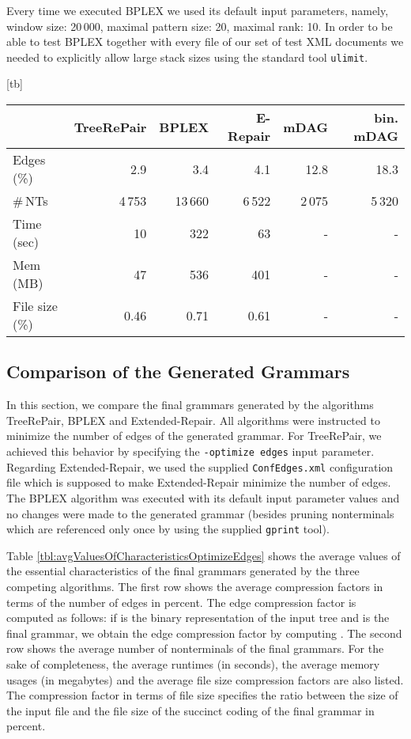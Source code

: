 \documentclass[12pt]{llncs}
\makeatletter
\renewenvironment{table}
               {\setlength\abovecaptionskip{10\p@}\setlength\belowcaptionskip{10\p@}\@float{table}}
               {\end@float}
\newcommand{\trp}{\mbox{TreeRePair}\xspace}
\makeatother
\begin{document}
Every time we executed BPLEX we used its default input parameters, namely, window size: 20\,000, maximal pattern size: 20, maximal rank: 10. In order to be able to test BPLEX together with every file of our set of test XML documents we needed to explicitly allow large stack sizes using the standard tool \texttt{ulimit}.

\begin{table}[tb]
	\centering\small
	\begin{tabular}{lrrrrr}
		\toprule
		&\trp&BPLEX&E-Repair&mDAG&bin. mDAG\\
		\midrule
		Edges (\%)&2.9&3.4&4.1&12.8&18.3\\
		\#\,NTs&4\,753&13\,660&6\,522&2\,075&5\,320\\
		\midrule
		Time (sec)&10&322&63&-&-\\
		Mem (MB)&47&536&401&-&-\\
		File size (\%)&0.46&0.71&0.61&-&-\\
		\bottomrule
	\end{tabular}
	\caption{Average values of the characteristics of the generated grammars and of the corresponding runs of the algorithms.}
	\label{tbl:avgValuesOfCharacteristicsOptimizeEdges}
\end{table}

\subsection{Comparison of the Generated Grammars}

In this section, we compare the final grammars generated by the algorithms \trp, BPLEX and Extended-Repair. All algorithms were instructed to minimize the number of edges of the generated grammar. For \trp, we achieved this behavior by specifying the \texttt{-optimize edges} input parameter. Regarding Extended-Repair, we used the supplied \texttt{ConfEdges.xml} configuration file which is supposed to make Extended-Repair minimize the number of edges. The BPLEX algorithm was executed with its default input parameter values and no changes were made to the generated grammar (besides pruning nonterminals which are referenced only once by using the supplied \texttt{gprint} tool).

Table \ref{tbl:avgValuesOfCharacteristicsOptimizeEdges} shows the average values of the essential characteristics of the final grammars generated by the three competing algorithms. The first row shows the average compression factors in terms of the number of edges in percent. The edge compression factor is computed as follows: if  is the binary representation of the input tree and  is the final grammar, we obtain the edge compression factor by computing . The second row shows the average number of nonterminals of the final grammars. For the sake of completeness, the average runtimes (in seconds), the average memory usages (in megabytes) and the average file size compression factors are also listed. The compression factor in terms of file size specifies the ratio between the size of the input file and the file size of the succinct coding of the final grammar in percent.
\end{document}
